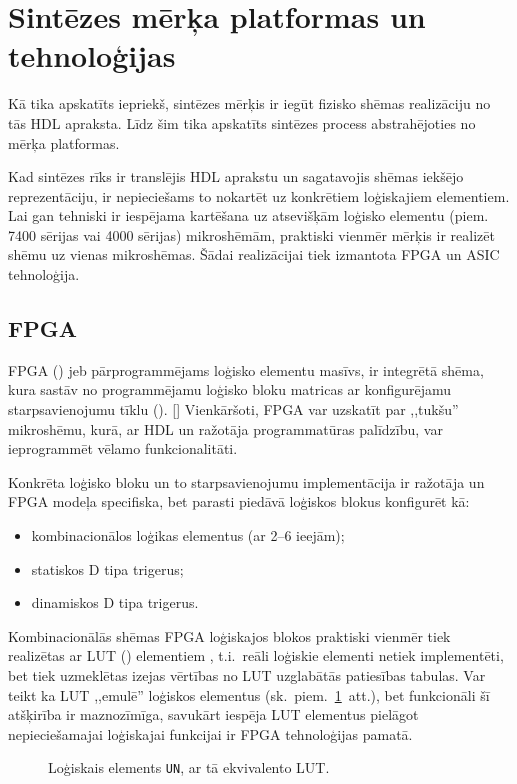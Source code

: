 \section{Sintēzes mērķa platformas un tehnoloģijas} \label{sec:synth}
Kā tika apskatīts iepriekš, sintēzes mērķis ir iegūt fizisko shēmas
realizāciju no tās HDL apraksta. Līdz šim tika apskatīts sintēzes process
abstrahējoties no mērķa platformas.

Kad sintēzes rīks ir translējis HDL aprakstu un sagatavojis shēmas 
iekšējo repre\-zen\-tā\-ciju, ir nepieciešams to nokartēt uz konkrētiem
loģiskajiem elementiem.\cite[5.~lpp.]{HDL}
Lai gan tehniski ir iespējama kartēšana uz
atsevišķām loģisko elementu (piem. 7400 sērijas vai 4000 sērijas)
mikroshēmām, praktiski vienmēr mērķis ir realizēt shēmu uz vienas
mikroshēmas. Šādai realizācijai tiek izmantota FPGA un ASIC tehnoloģija.

\subsection{FPGA}
	FPGA () jeb pārprogrammējams
	loģisko elementu masīvs, ir integrētā shēma, kura sastāv no
	programmējamu loģisko bloku matricas ar konfigurējamu starpsavienojumu
	tīklu (). [\todo]
	Vienkāršoti, FPGA var uzskatīt par ,,tukšu'' mikroshēmu, kurā, ar HDL
	un ražotāja programmatūras palīdzību, var ieprogrammēt vēlamo
	funkcionalitāti.
	
	Konkrēta loģisko bloku un to starpsavienojumu implementācija ir ražotāja un 
	FPGA modeļa	specifiska\cite{SmartFusionFabric}\cite{Xilinx7}, 
	bet parasti piedāvā loģiskos blokus konfigurēt kā:
	\begin{itemize}
		\item kombinacionālos loģikas elementus (ar 2--6 ieejām);
		\item statiskos D tipa trigerus;
		\item dinamiskos D tipa trigerus.
	\end{itemize}
	
	Kombinacionālās shēmas FPGA loģiskajos blokos praktiski vienmēr tiek
	realizētas ar LUT () elementiem%
	\cite{SmartFusionFabric}\cite{Xilinx7}, t.i.~reāli loģiskie elementi
	netiek imple\-men\-tēti, bet tiek uzmeklētas izejas vērtības no LUT
	uzglabātās patiesības tabulas. Var teikt ka LUT ,,emulē'' loģiskos
	elementus (sk.~piem.~\ref{fig:and2lut}~att.),
	bet funkcionāli šī atšķirība ir maznozīmīga, savukārt
	iespēja LUT elementus pielāgot nepieciešamajai loģiskajai funkcijai ir 
	FPGA tehnoloģijas pamatā.
	\begin{figure}[hb]
		\centering
		{\ttfamily\small}
		\caption{Loģiskais elements \texttt{UN}, ar tā ekvivalento LUT.}
		\label{fig:and2lut}
	\end{figure}
	
